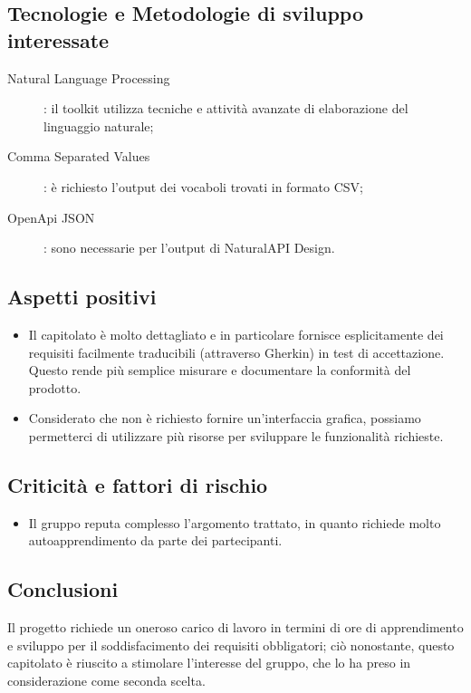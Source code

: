 \documentclass[../studio-di-fattibilita.tex]{subfiles}
\begin{document}
  \subsection{Tecnologie e Metodologie di sviluppo interessate}%
  \label{subsec:tecnologie_interessate}
  \begin{description}
    \item[Natural Language Processing]: il toolkit utilizza tecniche e attività avanzate di elaborazione del linguaggio naturale;
    \item[Comma Separated Values]: è richiesto l'output dei vocaboli trovati in formato CSV\@;
    \item[OpenApi JSON]: sono necessarie per l'output di NaturalAPI Design.
  \end{description}


  \subsection{Aspetti positivi}%
  \label{subsec:aspetti_positivi}
  \begin{itemize}
    \item Il capitolato è molto dettagliato e in particolare fornisce esplicitamente dei requisiti facilmente traducibili (attraverso Gherkin) in test di accettazione. Questo rende più semplice misurare e documentare la conformità del prodotto.
    \item Considerato che non è richiesto fornire un'interfaccia grafica, possiamo permetterci di utilizzare più risorse per sviluppare le funzionalità richieste.
  \end{itemize}


  \subsection{Criticità e fattori di rischio}%
  \label{subsec:criticita_e_fattori_di_rischio}
  \begin{itemize}
    \item Il gruppo reputa complesso l'argomento trattato, in quanto richiede molto autoapprendimento da parte dei partecipanti.
  \end{itemize}


  \subsection{Conclusioni}%
  \label{subsec:conclusioni}
  Il progetto richiede un oneroso carico di lavoro in termini di ore di apprendimento e sviluppo per il soddisfacimento dei requisiti obbligatori; ciò nonostante, questo capitolato è riuscito a stimolare l'interesse del gruppo, che lo ha preso in considerazione come seconda scelta.
\end{document}
